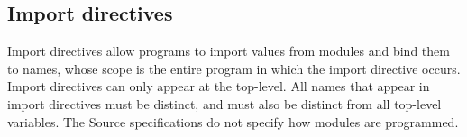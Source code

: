 \subsection*{Import directives}

Import directives allow programs to import values from modules and bind them to names, whose scope
is the entire program in which the import directive occurs.  Import directives can only appear at the top-level.  All names that appear in import directives
must be distinct, and must also be distinct from all top-level variables.  The Source specifications do not specify how modules are
programmed.
